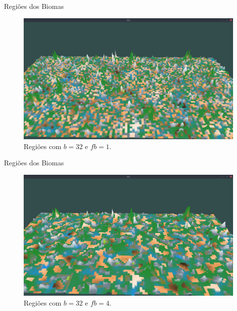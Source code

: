 \begin{frame}{Regiões dos Biomas}
    \begin{figure}[H]
        \centering
        \includegraphics[width=.9\textwidth]{img/re2bfb/fb/1b32.png}
        \caption{Regiões com $b = 32$ e $fb = 1$.}
        \label{fig:img_re2bfb_fb_1b32}
    \end{figure}
    
    
\end{frame}

\begin{frame}{Regiões dos Biomas}
    \begin{figure}[H]
        \centering
        \includegraphics[width=.9\textwidth]{img/re2bfb/fb/4b32.png}
        \caption{Regiões com $b = 32$ e $fb = 4$.}
        \label{fig:img_re2bfb_fb_4b32}
    \end{figure}
    
    
\end{frame}

